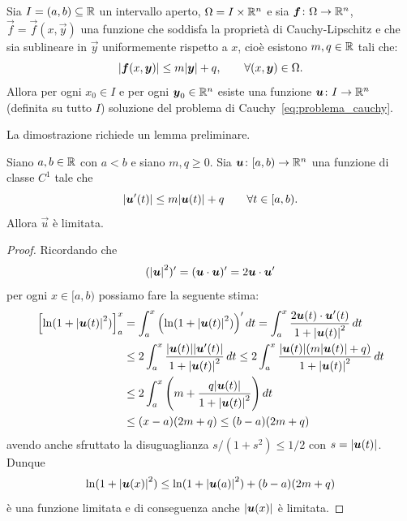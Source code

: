 \begin{theorem}
\label{th:edo_esistenza_globale}
Sia $I = (a,b) \subseteq \mathbb R$ un intervallo aperto, $\Omega=I\times \mathbb R^n$ e sia
$\boldsymbol f\colon \Omega \to \mathbb R^n$, $\vec f = \vec f(x,\vec y)$ una funzione che
soddisfa la proprietà di Cauchy-Lipschitz
e che sia sublineare in $\vec y$ uniformemente rispetto a $x$, cioè
esistono $m,q\in \mathbb R$ tali che:
\[
  {\left|\boldsymbol f(x,\boldsymbol y)\right|} \le m{\left|\boldsymbol y\right|} + q,
  \qquad\forall (x,\boldsymbol y)\in \Omega.
\]
Allora per ogni $x_0\in I$ e per ogni $\boldsymbol y_0\in \mathbb R^n$ esiste una funzione
$\boldsymbol u\colon I \to \mathbb R^n$ (definita su tutto $I$) soluzione del problema di Cauchy~\eqref{eq:problema_cauchy}.
\end{theorem}
%
La dimostrazione richiede un lemma preliminare.
\begin{lemma}[Gronwall]
Siano $a,b\in \mathbb R$ con $a<b$ e siano $m,q\ge 0$.
Sia $\boldsymbol u \colon [a,b) \to \mathbb R^n$ una funzione di classe $C^1$
tale che
\[
  {\left|\boldsymbol u'(t)\right|} \le m {\left|\boldsymbol u(t)\right|} + q
  \qquad \forall t\in [a,b).
\]
Allora $\vec u$ è limitata.
\end{lemma}
%
\begin{proof}
Ricordando che
\[
  ({\left|\boldsymbol u\right|}^2)'
  = (\boldsymbol u\cdot \boldsymbol u)'
  = 2 \boldsymbol u \cdot \boldsymbol u'
\]
per ogni $x\in [a,b)$ possiamo fare la seguente stima:
\begin{align*}
{\left[ \ln(1+{\left|\boldsymbol u(t)\right|}^2) \right]}_{a}^{x}
&= \int_{a}^{x}
  {\left( \ln(1+{\left|\boldsymbol u(t)\right|}^2) \right)}' \, dt
= \int_{a}^{x}
\frac{2\boldsymbol u(t)\cdot \boldsymbol u'(t)}{1+{\left|\boldsymbol u(t)\right|}^2}\, dt \\
&\le 2 \int_{a}^{x} \frac{{\left|\boldsymbol u(t)\right|} {\left|\boldsymbol u'(t)\right|}}{1+{\left|\boldsymbol u(t)\right|}^2}\, dt
\le 2\int_{a}^{x} \frac{{\left|\boldsymbol u(t)\right|}{\left( m{\left|\boldsymbol u(t)\right|}+q \right)}}{1+{\left|\boldsymbol u(t)\right|}^2}\, dt\\
&\le 2\int_{a}^{x} {\left( m + \frac{q{\left|\boldsymbol u(t)\right|}}{1+{\left|\boldsymbol u(t)\right|}^2} \right)}\, dt\\
&\le (x-a)(2m + q) \le (b-a)(2m+q)
\end{align*}
avendo anche sfruttato la disuguaglianza $s/(1+s^2) \le 1/2$ con $s={\left|\boldsymbol u(t)\right|}$.
Dunque
\[
  \ln(1+{\left|\boldsymbol u(x)\right|}^2) \le \ln(1+{\left|\boldsymbol u(a)\right|}^2) + (b-a)(2m+q)
\]
è una funzione limitata e di conseguenza anche ${\left|\boldsymbol u(x)\right|}$ è limitata.
\end{proof}

